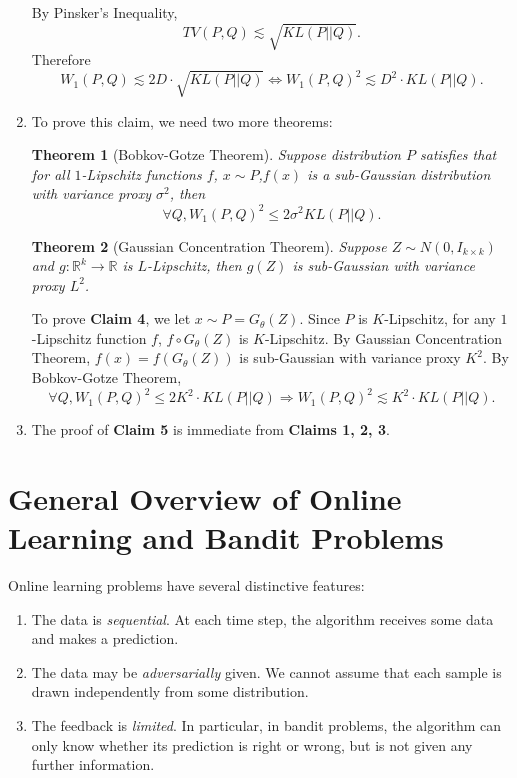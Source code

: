 \documentclass[11pt]{article}
\newtheorem{theorem}{Theorem}
\begin{document}
\begin{enumerate}
By Pinsker's Inequality, 
$$TV(P,Q) \lesssim \sqrt{KL(P||Q)}.$$ Therefore $$W_1(P,Q) \lesssim 2D \cdot \sqrt{KL(P||Q)} \iff W_1(P,Q)^2 \lesssim D^2 \cdot KL(P||Q).$$

\item To prove this claim, we need two more theorems:

\begin{theorem}[Bobkov-Gotze Theorem]

Suppose distribution $P$ satisfies that for all $1$-Lipschitz functions $f$, $x \sim P$,$f(x)$ is a sub-Gaussian distribution with variance proxy $\sigma ^2$, then $$\forall Q, W_1(P,Q)^2 \leq 2\sigma^2 KL(P||Q).$$
\end{theorem}


\begin{theorem}[Gaussian Concentration Theorem]

Suppose $Z \sim N(0,I_{k\times k})$ and $g: \mathbb{R}^k \rightarrow \mathbb{R}$ is $L$-Lipschitz, then $g(Z)$ is sub-Gaussian with variance proxy $L^2$.
\end{theorem}

To prove \textbf{Claim 4}, we let $x \sim P=G_\theta(Z)$. Since $P$ is $K$-Lipschitz, for any $1$-Lipschitz function $f$, $f \circ G_\theta(Z)$ is $K$-Lipschitz. By Gaussian Concentration Theorem, $f(x) = f(G_\theta(Z))$ is sub-Gaussian  with variance proxy $K^2$. By Bobkov-Gotze Theorem, $$\forall Q, W_1(P,Q)^2 \leq 2K^2 \cdot KL(P||Q) \Rightarrow W_1(P,Q)^2 \lesssim K^2 \cdot KL(P||Q).$$

\item The proof of \textbf{Claim 5} is immediate from \textbf{Claims 1, 2, 3}.


\end{enumerate}




\section{General Overview of Online Learning and Bandit Problems}

Online learning problems have several distinctive features:

\begin{enumerate}
    \item The data is {\em sequential}. At each time step, the algorithm receives some data and makes a prediction.
    
    \item The data may be {\em adversarially} given. We cannot assume that each sample is drawn independently from some distribution.
    
    \item The feedback is {\em limited}. In particular, in bandit problems, the algorithm can only know whether its prediction is right or wrong, but is not given any further information.
\end{enumerate}
\end{document}
